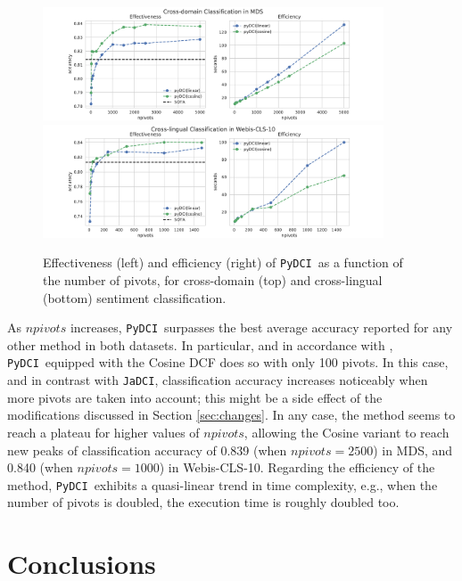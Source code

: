 \documentclass{article}
\newcommand{\jadci}{\texttt{JaDCI}}
\newcommand{\pydci}{\texttt{PyDCI}}
\begin{document}
\begin{figure}[ht!]
  \centering
  \includegraphics[width=0.9\textwidth]{cross_domain_varnpivots.pdf}
  \includegraphics[width=0.9\textwidth]{cross_lingual_varnpivots.pdf}
  \caption{Effectiveness (left) and efficiency (right) of \pydci\ as a
  function of the number of pivots, for cross-domain (top) and
  cross-lingual (bottom) sentiment classification. }
  \label{fig:varying}
\end{figure}

As $npivots$ increases, \pydci\ surpasses the best average accuracy
reported for any other method in both datasets. In particular, and in
accordance with \citep{Moreo:2016fg}, \pydci\ equipped with the Cosine
DCF does so with only 100 pivots.  In this case, and in contrast with
\jadci, classification accuracy increases noticeably when more pivots
are taken into account; this might be a side effect of the
modifications discussed in Section \ref{sec:changes}.  In any case,
the method seems to reach a plateau for higher values of $npivots$,
allowing the Cosine variant to reach new peaks of classification
accuracy of 0.839 (when $npivots=2500$) in MDS, and 0.840 (when
$npivots=1000$) in Webis-CLS-10.  Regarding the efficiency of the
method, \pydci\ exhibits a quasi-linear trend in time complexity,
e.g., when the number of pivots is doubled, the execution time is
roughly doubled too.


\section{Conclusions}
\label{sec:conclusion}
\end{document}
